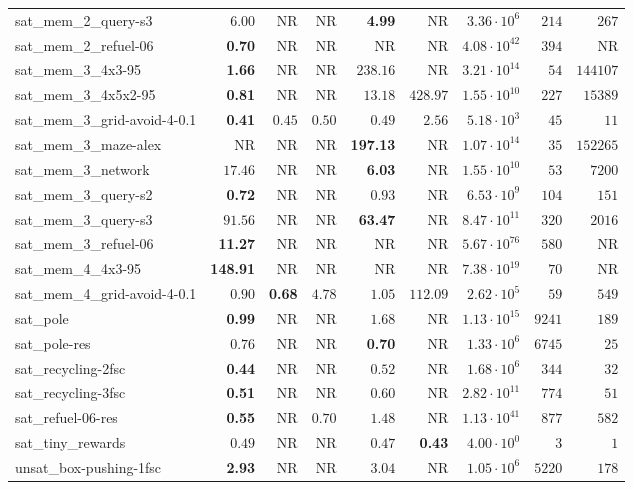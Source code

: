 \begin{tabular}{lrrrrrrrr}
sat\_mem\_2\_query-s3 & $6.00$ & NR & NR & \textbf{4.99} & NR & $3.36\cdot 10^{6}$ & $214$ & $267$ \\
sat\_mem\_2\_refuel-06 & \textbf{0.70} & NR & NR & NR & NR & $4.08\cdot 10^{42}$ & $394$ & NR \\
sat\_mem\_3\_4x3-95 & \textbf{1.66} & NR & NR & $238.16$ & NR & $3.21\cdot 10^{14}$ & $54$ & $144107$ \\
sat\_mem\_3\_4x5x2-95 & \textbf{0.81} & NR & NR & $13.18$ & $428.97$ & $1.55\cdot 10^{10}$ & $227$ & $15389$ \\
sat\_mem\_3\_grid-avoid-4-0.1 & \textbf{0.41} & $0.45$ & $0.50$ & $0.49$ & $2.56$ & $5.18\cdot 10^{3}$ & $45$ & $11$ \\
sat\_mem\_3\_maze-alex & NR & NR & NR & \textbf{197.13} & NR & $1.07\cdot 10^{14}$ & $35$ & $152265$ \\
sat\_mem\_3\_network & $17.46$ & NR & NR & \textbf{6.03} & NR & $1.55\cdot 10^{10}$ & $53$ & $7200$ \\
sat\_mem\_3\_query-s2 & \textbf{0.72} & NR & NR & $0.93$ & NR & $6.53\cdot 10^{9}$ & $104$ & $151$ \\
sat\_mem\_3\_query-s3 & $91.56$ & NR & NR & \textbf{63.47} & NR & $8.47\cdot 10^{11}$ & $320$ & $2016$ \\
sat\_mem\_3\_refuel-06 & \textbf{11.27} & NR & NR & NR & NR & $5.67\cdot 10^{76}$ & $580$ & NR \\
sat\_mem\_4\_4x3-95 & \textbf{148.91} & NR & NR & NR & NR & $7.38\cdot 10^{19}$ & $70$ & NR \\
sat\_mem\_4\_grid-avoid-4-0.1 & $0.90$ & \textbf{0.68} & $4.78$ & $1.05$ & $112.09$ & $2.62\cdot 10^{5}$ & $59$ & $549$ \\
sat\_pole & \textbf{0.99} & NR & NR & $1.68$ & NR & $1.13\cdot 10^{15}$ & $9241$ & $189$ \\
sat\_pole-res & $0.76$ & NR & NR & \textbf{0.70} & NR & $1.33\cdot 10^{6}$ & $6745$ & $25$ \\
sat\_recycling-2fsc & \textbf{0.44} & NR & NR & $0.52$ & NR & $1.68\cdot 10^{6}$ & $344$ & $32$ \\
sat\_recycling-3fsc & \textbf{0.51} & NR & NR & $0.60$ & NR & $2.82\cdot 10^{11}$ & $774$ & $51$ \\
sat\_refuel-06-res & \textbf{0.55} & NR & $0.70$ & $1.48$ & NR & $1.13\cdot 10^{41}$ & $877$ & $582$ \\
sat\_tiny\_rewards & $0.49$ & NR & NR & $0.47$ & \textbf{0.43} & $4.00\cdot 10^{0}$ & $3$ & $1$ \\
unsat\_box-pushing-1fsc & \textbf{2.93} & NR & NR & $3.04$ & NR & $1.05\cdot 10^{6}$ & $5220$ & $178$ \\

\end{tabular}
